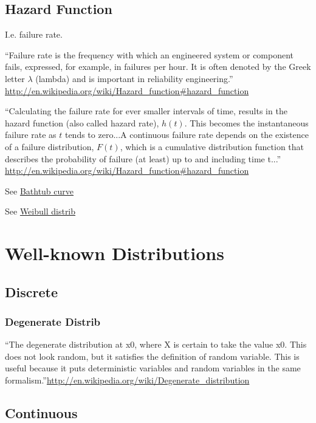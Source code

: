 \documentclass[reqno,12pt]{tufte-book}
\numberwithin{equation}{subsection}
\begin{document}
\section{Hazard Function}

I.e. failure rate.

``Failure rate is the frequency with which an engineered system or
component fails, expressed, for example, in failures per hour. It is
often denoted by the Greek letter $\lambda$ (lambda) and is important in
reliability engineering.''
\url{http://en.wikipedia.org/wiki/Hazard_function#hazard_function}

``Calculating the failure rate for ever smaller intervals of time,
results in the hazard function (also called hazard rate), $h(t)$. This
becomes the instantaneous failure rate as $t$ tends
to zero...A continuous failure rate depends on the existence of a
failure distribution, $F(t)$, which is a cumulative
distribution function that describes the probability of failure (at
least) up to and including time t...''
\url{http://en.wikipedia.org/wiki/Hazard_function#hazard_function}

See \href{http://en.wikipedia.org/wiki/Bathtub_curve}{Bathtub curve}

See \href{http://en.wikipedia.org/wiki/Weibull_chart}{Weibull distrib}

\chapter{Well-known Distributions}

\section{Discrete}

\subsection{Degenerate Distrib}

``The degenerate distribution at x0, where X is certain to take the
value x0. This does not look random, but it satisfies the definition
of random variable. This is useful because it puts deterministic
variables and random variables in the same
formalism.''\url{http://en.wikipedia.org/wiki/Degenerate_distribution}

\section{Continuous}
\end{document}
